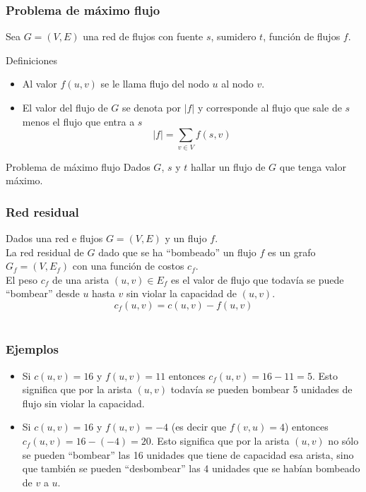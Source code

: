 \documentclass{beamer}
\begin{document}
	\begin{frame}
		\frametitle{Problema de máximo flujo}
		Sea $G = (V, E)$ una red de flujos con fuente $s$, sumidero $t$, función de flujos $f$.
		\begin{block}{Definiciones}
			\begin{itemize}
				\item Al valor $f(u,v)$ se le llama flujo del nodo $u$ al nodo $v$.
				\item El valor del flujo de $G$ se denota por $|f|$ y corresponde al flujo que sale de $s$ menos el flujo que entra a $s$ $$|f| = \displaystyle\sum_{v\in V}{f(s,v)}$$
			\end{itemize}
		\end{block}
	
		\begin{block}{Problema de máximo flujo}
			Dados $G$, $s$ y $t$ hallar un flujo de $G$ que tenga valor máximo.
		\end{block}
	\end{frame}
		
		
	\begin{frame}
		\frametitle{Red residual}
		Dados una red e flujos $G = (V, E)$ y un flujo $f$.\\
		La red residual de $G$ dado que se ha ``bombeado'' un flujo $f$ es un grafo $G_f = (V, E_f)$ con una función de costos $c_f$.\\ 
		El peso $c_f$ de una arista $(u, v) \in E_f$ es el valor de flujo que todavía se puede ``bombear'' desde $u$ hasta $v$ sin violar la capacidad de $(u, v)$.\\
		$$c_f(u,v) = c(u,v) - f(u,v)$$\\
	\end{frame}

	\begin{frame}
		\frametitle{Ejemplos}
		\begin{itemize}
			\item Si $c(u,v) = 16$ y $f(u,v) = 11$ entonces $c_f(u,v) = 16 - 11 = 5$. Esto significa que por la arista $(u,v)$ todavía se pueden bombear 5 unidades de flujo sin violar la capacidad.
			\item Si $c(u,v) = 16$ y $f(u,v) = -4$ (es decir que $f(v, u) = 4$) entonces $c_f(u,v) = 16 - (-4) = 20$. Esto significa que por la arista $(u,v)$ no sólo se pueden ``bombear'' las 16 unidades que tiene de capacidad esa arista, sino que también se pueden ``desbombear'' las 4 unidades que se habían bombeado de $v$ a $u$.
		\end{itemize}
	\end{frame}
\end{document}
